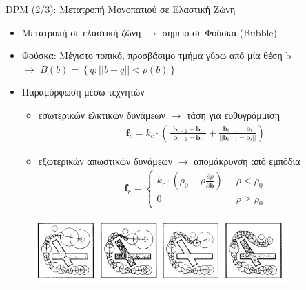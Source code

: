 \documentclass[10pt, compress, handout]{beamer} %
\begin{document}
\begin{frame}{DPM (2/3): Μετατροπή Μονοπατιού σε Ελαστική Ζώνη}
	\begin{itemize}
		\item Μετατροπή σε ελαστική ζώνη $\rightarrow$ σημείο σε Φούσκα (Bubble)
		\item Φούσκα: Μέγιστο τοπικό, προσβάσιμο τμήμα γύρω από μία θέση b\\
		 $\rightarrow$ $B(b) = \left\lbrace q : ||b - q|| < \rho(b)\right\rbrace$
		\item Παραμόρφωση μέσω τεχνητών
		\begin{itemize}
			\item εσωτερικών ελκτικών δυνάμεων $\rightarrow$ τάση για ευθυγράμμιση
				\begin{align*}
					\mathbf{f}_c = k_c \cdot \left( \frac{\mathbf{b}_{i-1} - \mathbf{b}_i}{||\mathbf{b}_{i-1} - \mathbf{b}_i||} + \frac{\mathbf{b}_{i+1} - \mathbf{b}_i}{||\mathbf{b}_{i+1} - \mathbf{b}_i||}  \right)
				\end{align*}
			\item εξωτερικών απωστικών δυνάμεων $\rightarrow$ απομάκρυνση από εμπόδια
				\begin{align*}
					\mathbf{f}_r = \begin{cases}
						k_r \cdot \left(\rho_0 - \rho \frac{\partial\rho}{\partial \mathbf{b}}\right) \;\; &\rho < \rho_0\\
						0 \;\; &\rho \geq \rho_0
				 \end{cases}
			 \end{align*}
		\end{itemize}
	\end{itemize}
	
	\begin{figure}
		\includegraphics[height=2.5cm]{Figures/eband.png}
	\end{figure}
\end{frame}
\end{document}
